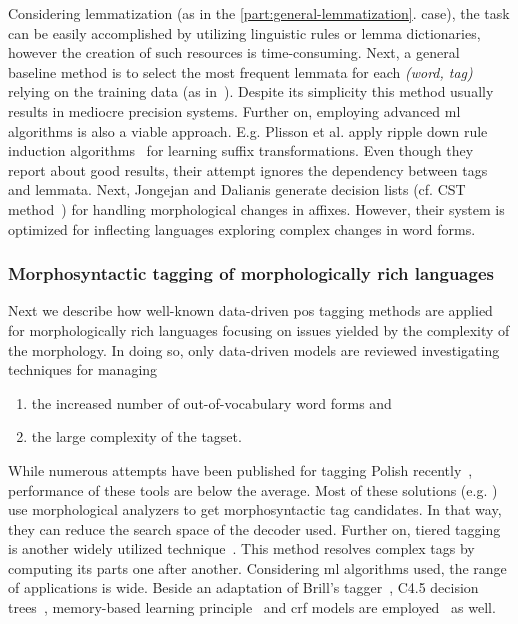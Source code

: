 Considering lemmatization (as in the \ref{part:general-lemmatization}. case), the task can be easily accomplished by utilizing linguistic rules or lemma dictionaries, however the creation of such resources is time-consuming.
Next, a general baseline method is to select the most frequent lemmata for each \emph{(word, tag)} relying on the training data (as in~\cite{zsibrata2013magyarlanc}). 
Despite its simplicity this method usually results in mediocre precision systems.
Further on, employing advanced \gls{ml} algorithms is also a viable approach.
E.g. Plisson et al. apply ripple down rule induction algorithms~\cite{Plisson2004} for learning suffix transformations.
Even though they report about good results, their attempt ignores the dependency between tags and lemmata.
Next, Jongejan and Dalianis generate decision lists (cf. CST method~\cite{Jongejan}) for handling morphological changes in affixes.
However, their system is optimized for inflecting languages exploring complex changes in word forms.  

\subsubsection{Morphosyntactic tagging of morphologically rich languages}

Next we describe how well-known data-driven \gls{pos} tagging methods are applied for morphologically rich languages focusing on issues yielded by the complexity of the morphology.
In doing so, only data-driven models are reviewed investigating techniques for managing
\begin{enumerate}
  \item the increased number of out-of-vocabulary word forms and
  \item the large complexity of the tagset. 
\end{enumerate}

While numerous attempts have been published for tagging Polish recently~\cite{Piasecki2006,Piasecki2007,Acedanski2010,Radziszewski2013},  performance of these tools are below the average.
Most of these solutions (e.g. \cite{Radziszewski2013}) use morphological analyzers to get morphosyntactic tag candidates. In that way, they can reduce the search space of the decoder used.
Further on, tiered tagging is another widely utilized technique~\cite{Radziszewski2013}.
This method resolves complex tags by computing its parts one after another.
Considering \acrshort{ml} algorithms used, the range of applications is wide.
Beside an adaptation of Brill’s tagger~\cite{Acedanski2010}, C4.5 decision trees~\cite{Piasecki2007}, memory-based learning principle~\cite{Radziszewski2011} and \acrshort{crf} models are employed~\cite{Radziszewski2013} as well. 

